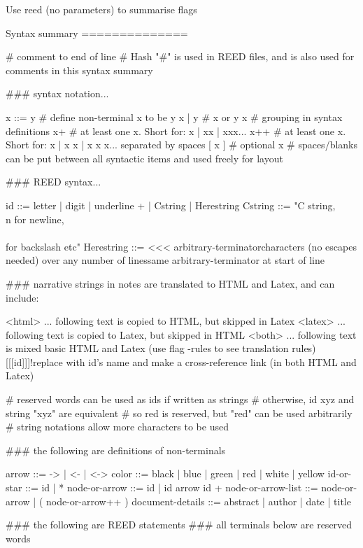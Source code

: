 Use reed (no parameters) to summarise flags

Syntax summary
==============

# comment to end of line
# Hash "#" is used in REED files, and is also used for comments in this syntax summary

### syntax notation...

x ::= y # define non-terminal x to be y
x | y   # x or y
{ x }   # grouping in syntax definitions
x+      # at least one x. Short for: x | xx | xxx...
x++     # at least one x. Short for: x | x x | x x x... separated by spaces
[ x ]   # optional x
        # spaces/blanks can be put between all syntactic items and used freely for layout 

### REED syntax...

id ::= { letter | digit | underline }+ | Cstring | Herestring
Cstring ::= "C string, \\n for newline, \\\\ for backslash etc" 
Herestring ::= <<< arbitrary-terminator\n                           characters (no escapes needed) over any number of lines\n                       same arbitrary-terminator at start of line

### narrative strings in notes are translated to HTML and Latex, and can include:

<html> ...  following text is copied to HTML, but skipped in Latex
<latex> ... following text is copied to Latex, but skipped in HTML
<both> ...  following text is mixed basic HTML and Latex (use flag -rules to see translation rules)
[[[id]]]!replace with id's name and make a cross-reference link (in both HTML and Latex)

# reserved words can be used as ids if written as strings
# otherwise, id xyz and string "xyz" are equivalent
# so red is reserved, but "red" can be used arbitrarily
# string notations allow more characters to be used

### the following are definitions of non-terminals

arrow ::= -> | <- | <->
color ::= black | blue | green | red | white | yellow
id-or-star ::= id | *
node-or-arrow ::= id | id { arrow id }+
node-or-arrow-list ::= node-or-arrow | ( node-or-arrow++ )
document-details ::= abstract | author | date | title

### the following are REED statements
### all terminals below are reserved words

